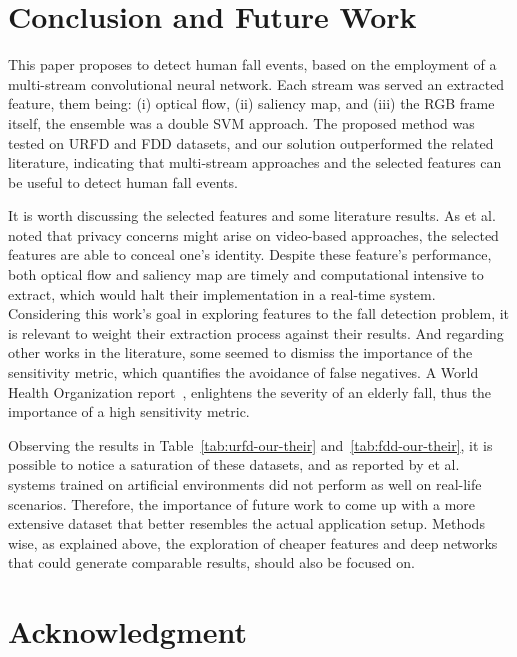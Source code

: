 \documentclass[conference]{IEEEtran}
\begin{document}
\section{Conclusion and Future Work}

This paper proposes to detect human fall events, based on the employment of a multi-stream convolutional neural network. Each stream was served an extracted feature, them being: (i) optical flow, (ii) saliency map, and (iii) the RGB frame itself, the ensemble was a double SVM approach. The proposed method was tested on URFD and FDD datasets, and our solution outperformed the related literature, indicating that multi-stream approaches and the selected features can be useful to detect human fall events.

It is worth discussing the selected features and some literature results. As et al.~\cite{chernbumroong2012elderly} noted that privacy concerns might arise on video-based approaches, the selected features are able to conceal one's identity. Despite these feature's performance, both optical flow and saliency map are timely and computational intensive to extract, which would halt their implementation in a real-time system. Considering this work's goal in exploring features to the fall detection problem, it is relevant to weight their extraction process against their results. And regarding other works in the literature, some seemed to dismiss the importance of the sensitivity metric, which quantifies the avoidance of false negatives. A World Health Organization report~\cite{who2007report}, enlightens the severity of an elderly fall, thus the importance of a high sensitivity metric.

Observing the results in Table~\ref{tab:urfd-our-their} and~\ref{tab:fdd-our-their}, it is possible to notice a saturation of these datasets, and as reported by et al.~\cite{chernbumroong2012elderly} systems trained on artificial environments did not perform as well on real-life scenarios. Therefore, the importance of future work to come up with a more extensive dataset that better resembles the actual application setup. Methods wise, as explained above, the exploration of cheaper features and deep networks that could generate comparable results, should also be focused on.

\section*{Acknowledgment}




\end{document}
